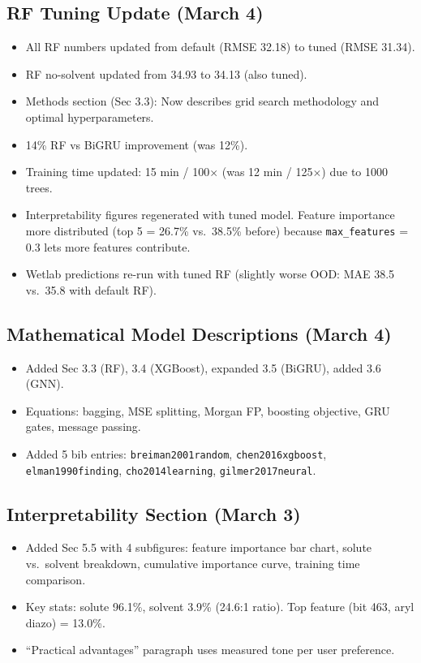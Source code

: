 \documentclass[11pt,a4paper]{article}
\begin{document}
\subsection{RF Tuning Update (March 4)}
\begin{itemize}
    \item All RF numbers updated from default (RMSE 32.18) to tuned (RMSE 31.34).
    \item RF no-solvent updated from 34.93 to 34.13 (also tuned).
    \item Methods section (Sec 3.3): Now describes grid search methodology and optimal hyperparameters.
    \item 14\% RF vs BiGRU improvement (was 12\%).
    \item Training time updated: 15 min / 100$\times$ (was 12 min / 125$\times$) due to 1000 trees.
    \item Interpretability figures regenerated with tuned model. Feature importance more distributed (top 5 = 26.7\% vs.\ 38.5\% before) because \texttt{max\_features} = 0.3 lets more features contribute.
    \item Wetlab predictions re-run with tuned RF (slightly worse OOD: MAE 38.5 vs.\ 35.8 with default RF).
\end{itemize}

\subsection{Mathematical Model Descriptions (March 4)}
\begin{itemize}
    \item Added Sec 3.3 (RF), 3.4 (XGBoost), expanded 3.5 (BiGRU), added 3.6 (GNN).
    \item Equations: bagging, MSE splitting, Morgan FP, boosting objective, GRU gates, message passing.
    \item Added 5 bib entries: \texttt{breiman2001random}, \texttt{chen2016xgboost}, \texttt{elman1990finding}, \texttt{cho2014learning}, \texttt{gilmer2017neural}.
\end{itemize}

\subsection{Interpretability Section (March 3)}
\begin{itemize}
    \item Added Sec 5.5 with 4 subfigures: feature importance bar chart, solute vs.\ solvent breakdown, cumulative importance curve, training time comparison.
    \item Key stats: solute 96.1\%, solvent 3.9\% (24.6:1 ratio). Top feature (bit 463, aryl diazo) = 13.0\%.
    \item ``Practical advantages'' paragraph uses measured tone per user preference.
\end{itemize}
\end{document}
